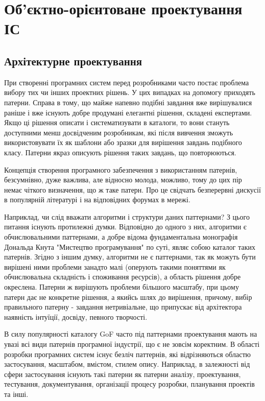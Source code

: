 \documentclass[../main.tex]{subfiles}
\begin{document}
\chapter{Об’єктно-орієнтоване проектування ІС}

\section{Архітектурне проектування}

При створенні програмних систем перед розробниками часто постає проблема вибору тих чи інших проектних рішень. У цих випадках на допомогу приходять патерни. Справа в тому, що майже напевно подібні завдання вже вирішувалися раніше і вже існують добре продумані елегантні рішення, складені експертами. Якщо ці рішення описати і систематизувати в каталоги, то вони стануть доступними менш досвідченим розробникам, які після вивчення зможуть використовувати їх як шаблони або зразки для вирішення завдань подібного класу. Патерни якраз описують рішення таких завдань, що повторюються.

Концепція створення програмного забезпечення з використанням патернів, безсумнівно, дуже важлива, але відносно молода, можливо, тому до цих пір немає чіткого визначення, що ж таке патерн. Про це свідчать безперервні дискусії в популярній літературі і на відповідних форумах в мережі.

Наприклад, чи слід вважати алгоритми і структури даних паттернами? З цього питання існують протилежні думки. Відповідно до одного з них, алгоритми є обчислювальними паттернами, а добре відома фундаментальна монографія Дональда Кнута "Мистецтво програмування" по суті, являє собою каталог таких патернів. Згідно з іншим думку, алгоритми не є паттернами, так як можуть бути вирішені ними проблеми занадто малі (оперують такими поняттями як обчислювальна складність і споживання ресурсів), а область рішення добре окреслена. Патерни ж вирішують проблеми більшого масштабу, при цьому патерн дає не конкретне рішення, а якийсь шлях до вирішення, причому, вибір правильного патерну - завдання нетривіальне, що припускає від архітектора наявність інтуїції, досвіду, певного творчості.

В силу популярності каталогу GoF \cite{gof} часто під паттернами проектування мають на увазі всі види патернів програмної індустрії, що є не зовсім коректним. В області розробки програмних систем існує безліч паттернів, які відрізняються областю застосування, масштабом, вмістом, стилем опису. Наприклад, в залежності від сфери застосування існують такі патерни як патерни аналізу, проектування, тестування, документування, організації процесу розробки, планування проектів та інші.
\end{document}
